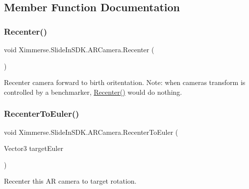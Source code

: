 \subsection{Member Function Documentation}
\mbox{\label{class_ximmerse_1_1_slide_in_s_d_k_1_1_a_r_camera_a145ca3909076668b5d1e273b4efdbc19}} 
\subsubsection{\texorpdfstring{Recenter()}{Recenter()}}
{\footnotesize\ttfamily void Ximmerse.\+Slide\+In\+S\+D\+K.\+A\+R\+Camera.\+Recenter (\begin{DoxyParamCaption}{ }\end{DoxyParamCaption})}



Recenter camera forward to birth oritentation. Note\+: when camera\textquotesingle{}s transform is controlled by a benchmarker, \mbox{\hyperlink{class_ximmerse_1_1_slide_in_s_d_k_1_1_a_r_camera_a145ca3909076668b5d1e273b4efdbc19}{Recenter()}} would do nothing. 

\mbox{\label{class_ximmerse_1_1_slide_in_s_d_k_1_1_a_r_camera_ae33579df6b8710e4017106c75a14d831}} 
\subsubsection{\texorpdfstring{Recenter\+To\+Euler()}{RecenterToEuler()}}
{\footnotesize\ttfamily void Ximmerse.\+Slide\+In\+S\+D\+K.\+A\+R\+Camera.\+Recenter\+To\+Euler (\begin{DoxyParamCaption}\item[{Vector3}]{target\+Euler }\end{DoxyParamCaption})}



Recenter this AR camera to target rotation. 


